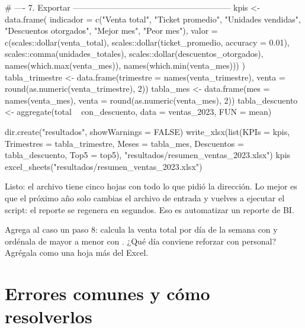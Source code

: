 \begin{rcode}
# ---- 7. Exportar ---------------------------------------------------------
kpis <- data.frame(
  indicador = c("Venta total", "Ticket promedio", "Unidades vendidas",
                "Descuentos otorgados", "Mejor mes", "Peor mes"),
  valor = c(scales::dollar(venta_total),
            scales::dollar(ticket_promedio, accuracy = 0.01),
            scales::comma(unidades_totales),
            scales::dollar(descuentos_otorgados),
            names(which.max(venta_mes)), names(which.min(venta_mes)))
)
tabla_trimestre <- data.frame(trimestre = names(venta_trimestre),
                              venta = round(as.numeric(venta_trimestre), 2))
tabla_mes <- data.frame(mes = names(venta_mes),
                        venta = round(as.numeric(venta_mes), 2))
tabla_descuento <- aggregate(total ~ con_descuento, data = ventas_2023,
                             FUN = mean)

dir.create("resultados", showWarnings = FALSE)
write_xlsx(list(KPIs = kpis, Trimestres = tabla_trimestre,
                Meses = tabla_mes, Descuentos = tabla_descuento,
                Top5 = top5),
           "resultados/resumen_ventas_2023.xlsx")
kpis
excel_sheets("resultados/resumen_ventas_2023.xlsx")
\end{rcode}

Listo: el archivo  tiene
cinco hojas con todo lo que pidió la dirección. Lo mejor es que el próximo
año solo cambias el archivo de entrada y vuelves a ejecutar el script: el
reporte se regenera en segundos. Eso es automatizar un reporte de BI.

\begin{hazlotu}
Agrega al caso un paso 8: calcula la venta total por día de la semana con
 y ordénala de mayor a menor con . ¿Qué día
conviene reforzar con personal? Agrégala como una hoja más del Excel.
\end{hazlotu}

\section{Errores comunes y cómo resolverlos}
\label{sec:m1-errores}


